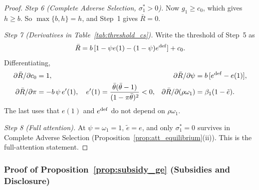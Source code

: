 \begin{proof}
\emph{Step 6 (Complete Adverse Selection, $\sigma_1^*>0$).} Now $g_1\ge c_0$, which gives $h\ge b$. So $\max\{b,h\}=h$, and Step~1 gives $\bar R=0$.

\emph{Step 7 (Derivatives in Table~\ref{tab:threshold_cs}).} Write the threshold of Step~5 as
\begin{equation*}
    \bar R=b\,[1-\psi e(1)-(1-\psi)e^{\rm def}]+c_0.
\end{equation*}
Differentiating,
\begin{align*}
    \partial\bar R/\partial c_0&=1, & \partial\bar R/\partial\psi&=b\,[e^{\rm def}-e(1)],\\
    \partial\bar R/\partial\pi&=-b\,\psi\,e'(1),\quad e'(1)=\frac{\bar\theta(\bar\theta-1)}{(1-\pi\bar\theta)^2}<0, & \partial\bar R/\partial(\rho\omega_1)&=\beta_1(1-\tilde e).
\end{align*}
The last uses that $e(1)$ and $e^{\rm def}$ do not depend on $\rho\omega_1$.

\emph{Step 8 (Full attention).} At $\psi=\omega_1=1$, $\tilde e=e$, and only $\sigma_1^*=0$ survives in Complete Adverse Selection (Proposition~\ref{prop:att_equilibrium}(ii)). This is the full-attention statement.
\end{proof}

\subsubsection*{Proof of Proposition~\ref{prop:subsidy_ge} (Subsidies and Disclosure)}

